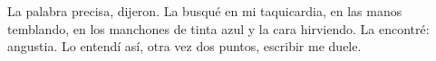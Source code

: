 
La palabra precisa, dijeron. La busqué en mi taquicardia, en las manos
temblando, en los manchones de tinta azul y la cara hirviendo. La
encontré: angustia. Lo entendí así, otra vez dos puntos, escribir me
duele.

